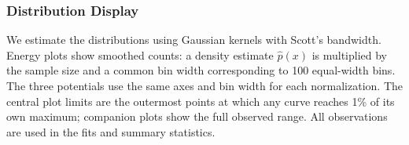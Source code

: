 \documentclass[%
 preprint,
superscriptaddress,
 amsmath,amssymb,
 aip,
 jcp,
]{revtex4-2}
\begin{document}


\subsubsection{Distribution Display}

We estimate the distributions using Gaussian kernels with Scott's bandwidth.
Energy plots show smoothed counts: a density estimate $\widehat p(x)$ is multiplied by the sample size and a common bin width corresponding to 100 equal-width bins.
The three potentials use the same axes and bin width for each normalization.
The central plot limits are the outermost points at which any curve reaches 1\% of its own maximum; companion plots show the full observed range.
All observations are used in the fits and summary statistics.

\end{document}
